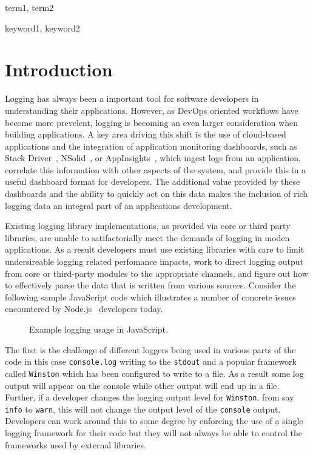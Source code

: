 \documentclass[preprint]{sig-alternate-05-2015}
\begin{document}
\terms
term1, term2

\keywords
keyword1, keyword2

\section{Introduction} 
\label{sec:intro}
Logging has always been a important tool for software developers in
understanding their applications. However, as DevOps oriented workflows have
become more prevelent, logging is becoming an even larger consideration when
building applications. A key area driving this shift is the use of cloud-based
applications and the integration of application monitoring dashboards, such as
Stack Driver~\cite{StackDriver}, NSolid~\cite{NSolid}, or
AppInsights~\cite{AppInsights}, which ingest logs from an application, correlate
this information with other aspects of the system, and provide this in a useful
dashboard format for developers. The additional value provided by these
dashboards and the ability to quickly act on this data makes the inclusion of
rich logging data an integral part of an applications development.

Existing logging library implementations, as provided via core or third party
libraries, are unable to satifactorially meet the demands of logging in moden
applications. As a result developers must use existing libraries with care to
limit undersireable logging related perfomance impacts, work to direct logging
output from core or third-party modules to the appropriate channels, and figure
out how to effectively parse the data that is written from various sources.
Consider the following sample JavaScript code which illustrates a number of
concrete issues encountered by Node.js~\cite{Node} developers today.

\begin{figure*}[t]

\label{sec:introExample}
\caption{Example logging usage in JavaScript.}
\end{figure*}

The first is the challenge of different loggers being used in various parts of
the code in this case \texttt{console.log} writing to the \texttt{stdout} and a
popular framework called \texttt{Winston} which has been configured to write to
a file. As a result some log output will appear on the console while other
output will end up in a file. Further, if a developer changes the logging output
level for \texttt{Winston}, from say \texttt{info} to \texttt{warn}, this will
not change the output level of the \texttt{console} output. Developers can work
around this to some degree by enforcing the use of a single logging framework
for their code but they will not always be able to control the frameworks used
by external libraries.
\end{document}
